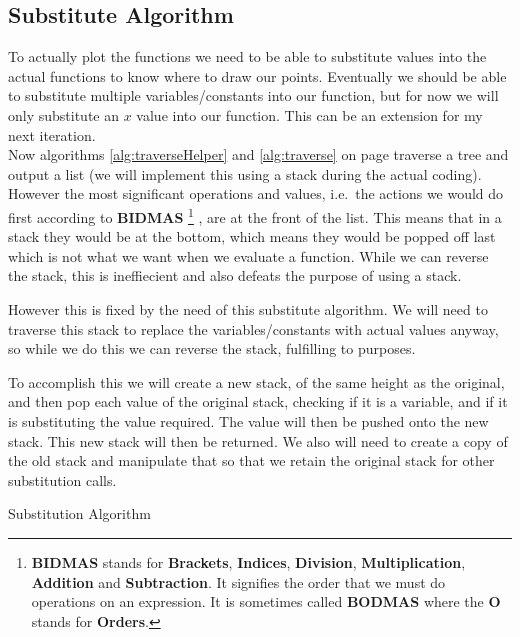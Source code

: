 \documentclass[../../../../../main.tex]{subfiles}
\begin{document}
\subsection{Substitute Algorithm}
To actually plot the functions we need to be able to substitute values into the actual functions to know where to draw our points. Eventually we should be able to substitute multiple variables/constants into our function, but for now we will only substitute an $x$ value into our function. This can be an extension for my next iteration.\\
Now algorithms \ref{alg:traverseHelper} and \ref{alg:traverse} on page \pageref{alg:traverseHelper} traverse a tree and output a list (we will implement this using a stack during the actual coding). However the most significant operations and values, i.e.\ the actions we would do first according to \textbf{BIDMAS}
\footnote{\textbf{BIDMAS} stands for \textbf{Brackets}, \textbf{Indices}, \textbf{Division}, \textbf{Multiplication}, \textbf{Addition} and \textbf{Subtraction}. It signifies the order that we must do operations on an expression. It is sometimes called \textbf{BODMAS} where the \textbf{O} stands for \textbf{Orders}.}
, are at the front of the list. This means that in a stack they would be at the bottom, which means they would be popped off last which is not what we want when we evaluate a function. While we can reverse the stack, this is ineffiecient and also defeats the purpose of using a stack.

However this is fixed by the need of this substitute algorithm. We will need to traverse this stack to replace the variables/constants with actual values anyway, so while we do this we can reverse the stack, fulfilling to purposes.

To accomplish this we will create a new stack, of the same height as the original, and then pop each value of the original stack, checking if it is a variable, and if it is substituting the value required. The value will then be pushed onto the new stack. This new stack will then be returned. We also will need to create a copy of the old stack and manipulate that so that we retain the original stack for other substitution calls.

\begin{algorithm}
\caption{Substitution Algorithm}
\DontPrintSemicolon
{}
\end{algorithm}
\newpage
\end{document}
